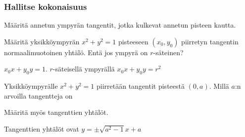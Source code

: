 \begin{tehtavasivu}
\subsubsection*{Hallitse kokonaisuus}
\begin{tehtava}
	Määritä annetun ympyrän tangentit, jotka kulkevat annetun pisteen kautta.
	\begin{alakohdat}
	\end{alakohdat}
	\begin{vastaus}
		\begin{alakohdat}
			\alakohta{$y=x-2$ ja $y=-x$}
			\alakohta{$y= -1/4 x -3$}
			\alakohta{$y=1$ ja $x=3$}
			\alakohta{Ei ole.}
		\end{alakohdat}
	\end{vastaus}
\end{tehtava}

\begin{tehtava}
Määritä yksikköympyrän $x^2+y^2= 1$ pisteeseen $(x_{0}, y_{0} )$ piirretyn tangentin normaalimuotoinen yhtälö. Entä jos ympyrä on $r$-säteinen?
\begin{vastaus}
$x_0x+y_0y=1 $. $r$-säteisellä ympyrällä $x_0x+y_0y=r^2$
\end{vastaus}
\end{tehtava}

\begin{tehtava}
Yksikköympyrälle $x^2+y^2=1$ piirretään tangentit pisteestä $(0, a)$. Millä $a$:n arvoilla tangentteja on 
\begin{alakohdat}
\end{alakohdat}
Määritä myös tangenttien yhtälöt.
\begin{vastaus}
\begin{alakohdat}
\end{alakohdat}
Tangenttien yhtälöt ovat $ y = \pm \sqrt{a^2-1}x+a$
\end{vastaus}
\end{tehtava}

\begin{tehtava}
\begin{alakohdat}
\end{alakohdat}


\end{tehtava}
\end{tehtavasivu}
